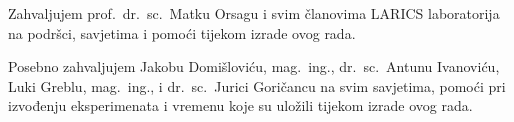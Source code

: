 Zahvaljujem prof.\ dr.\ sc.\ Matku Orsagu i svim članovima LARICS laboratorija na podršci, savjetima i pomoći tijekom izrade ovog rada.

Posebno zahvaljujem Jakobu Domišloviću, mag.\ ing., dr.\ sc.\ Antunu Ivanoviću, Luki Greblu, mag.\ ing., i dr.\ sc.\ Jurici Goričancu na svim savjetima, pomoći pri izvođenju eksperimenata i vremenu koje su uložili tijekom izrade ovog rada.
